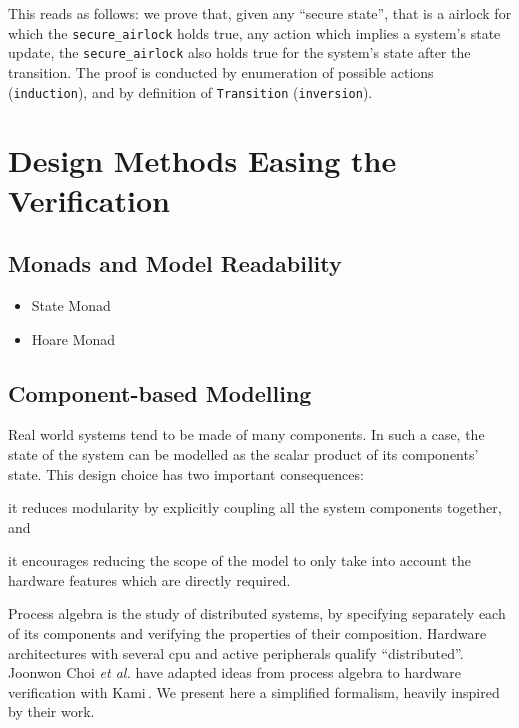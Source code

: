 \begin{example}
  \inputminted[frame=single]{coq}{Listings/Airlock4.v}

  This reads as follows: we prove that, given any ``secure state'', that is a
  airlock for which the \texttt{secure\_airlock} holds true, any action which
  implies a system's state update, the \texttt{secure\_airlock} also holds true
  for the system's state after the transition.
  The proof is conducted by enumeration of possible actions
  (\texttt{induction}), and by definition of \texttt{Transition}
  (\texttt{inversion}).
\end{example}

\section{Design Methods Easing the Verification}
\label{sec:related:ease}

\subsection{Monads and Model Readability}

\begin{itemize}
\item State Monad
\item Hoare Monad
\end{itemize}

\subsection{Component-based Modelling}

Real world systems tend to be made of many components.
%
In such a case, the state of the system can be modelled as the scalar product of
its components' state.
%
This design choice has two important consequences:
%
\begin{inparaenum}[(1)]
%
\item it reduces modularity by explicitly coupling all the system components
  together, and
%
\item it encourages reducing the scope of the model to only take into account
  the hardware features which are directly required.
%
\end{inparaenum}

Process algebra is the study of distributed systems, by specifying separately
each of its components and verifying the properties of their composition.
%
Hardware architectures with several \ac{cpu} and active peripherals qualify
``distributed''.
%
Joonwon Choi \emph{et al.} have adapted ideas from process algebra to hardware
verification with Kami\,\cite{choi2017kami}.
%
We present here a simplified formalism, heavily inspired by their work.

